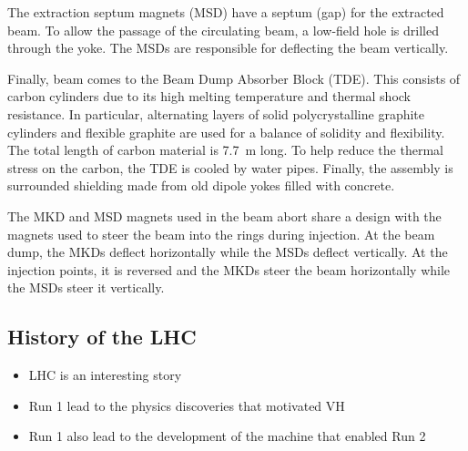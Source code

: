 The extraction septum magnets (MSD) have a septum (gap) for the extracted beam.
To allow the passage of the circulating beam, a low-field hole is drilled through the yoke.
The MSDs are responsible for deflecting the beam vertically.

Finally, beam comes to the Beam Dump Absorber Block (TDE).
This consists of carbon cylinders due to its high melting temperature and thermal shock resistance.
In particular, alternating layers of solid polycrystalline graphite cylinders and flexible graphite are used for a balance of solidity and flexibility.
The total length of carbon material is 7.7~m long.
To help reduce the thermal stress on the carbon, the TDE is cooled by water pipes.
Finally, the assembly is surrounded shielding made from old dipole yokes filled with concrete.

The MKD and MSD magnets used in the beam abort share a design with the magnets used to steer the beam into the rings during injection.
At the beam dump, the MKDs deflect horizontally while the MSDs deflect vertically.
At the injection points, it is reversed and the MKDs steer the beam horizontally while the MSDs steer it vertically.

\newpage

\subsection{History of the LHC}
\begin{itemize}
    \item LHC is an interesting story
    \item Run 1 lead to the physics discoveries that motivated VH
    \item Run 1 also lead to the development of the machine that enabled Run 2
\end{itemize}
